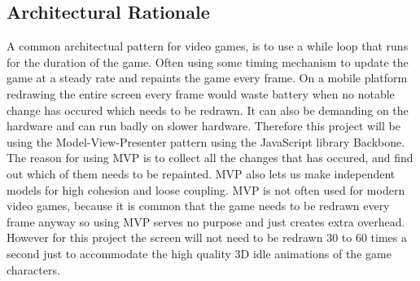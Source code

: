 \subsection{Architectural Rationale}

A common architectual pattern for video games, is to use a while loop that runs for the duration 
of the game. Often using some timing mechanism to update the game at a steady rate and repaints 
the game every frame. On a mobile platform redrawing the entire screen every frame would waste 
battery when no notable change has occured which needs to be redrawn. It can also be demanding 
on the hardware and can run badly on slower hardware. Therefore this project will be using the 
Model-View-Presenter pattern using the JavaScript library Backbone. The reason for using MVP is 
to collect all the changes that has occured, and find out which of them needs to be repainted. 
MVP also lets us make independent models for high cohesion and loose coupling. MVP is not often 
used for modern video games, because it is common that the game needs to be redrawn every frame 
anyway so using MVP serves no purpose and just creates extra overhead. However for this project 
the screen will not need to be redrawn 30 to 60 times a second just to accommodate the high quality 
3D idle animations of the game characters.

